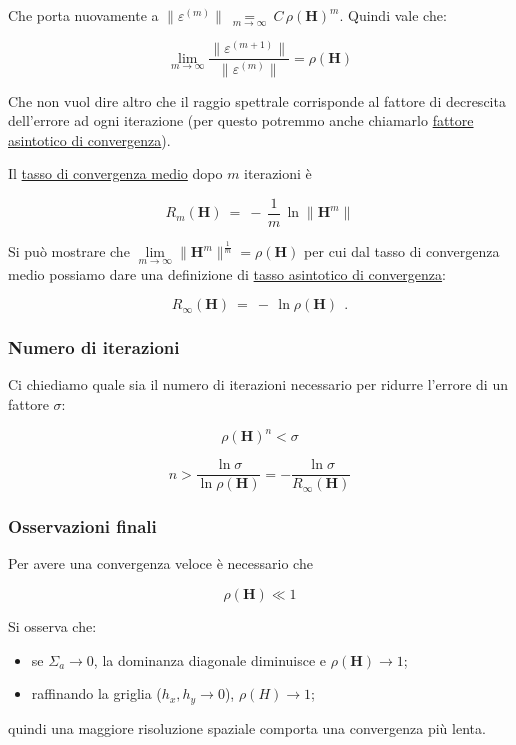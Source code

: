 Che porta nuovamente a $\|\varepsilon^{(m)}\| \ \underset{m\rightarrow \infty}{=}\ C\, \rho(\mathbf H)^m$. Quindi vale che:

\begin{equation*}
	\lim_{m \to \infty}
	\frac{\|\varepsilon^{(m+1)}\|}{\|\varepsilon^{(m)}\|}
	= \rho(\mathbf H)
\end{equation*}

Che non vuol dire altro che il raggio spettrale corrisponde al fattore di decrescita dell'errore ad ogni iterazione (per questo potremmo anche chiamarlo \underline{fattore asintotico di convergenza}).

Il \underline{tasso di convergenza medio} dopo $m$ iterazioni è

\begin{equation*}
	R_m (\mathbf H)\ =\ -\,\frac{1}{m}\, \ln \|\mathbf H^m\|
\end{equation*}

Si può mostrare che $\lim\limits_{m\rightarrow \infty}\|\mathbf H^m\|^{\frac{1}{m}}=\rho(\mathbf H)$ per cui dal tasso di convergenza medio possiamo dare una definizione di \underline{tasso asintotico di convergenza}:

\begin{equation*}
	R_\infty (\mathbf H)\ =\ -\,\ln\rho(\mathbf H)\ \ .
\end{equation*}



%
\subsubsection{Numero di iterazioni}

Ci chiediamo quale sia il numero di iterazioni necessario per ridurre l'errore di un fattore $\sigma$:

\begin{equation*}
	\rho(\mathbf H)^n < \sigma
\end{equation*}

\begin{equation*}
	n > \frac{\ln \sigma}{\ln \rho(\mathbf H)}
	= -\frac{\ln \sigma}{R_\infty(\mathbf H)}
\end{equation*}

\subsubsection{Osservazioni finali}

Per avere una convergenza veloce è necessario che

\begin{equation*}
	\rho(\mathbf H) \ll 1
\end{equation*}

Si osserva che:

\begin{itemize}
	\item se $\Sigma_a \to 0$, la dominanza diagonale diminuisce e $\rho(\mathbf H) \to 1$;
	\item raffinando la griglia ($h_x, h_y \to 0$), $\rho(H) \to 1$;
\end{itemize}

quindi una maggiore risoluzione spaziale comporta una convergenza più lenta.

